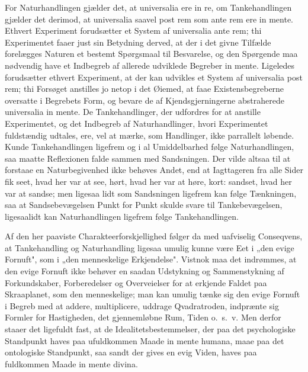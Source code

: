 \documentclass[12pt]{book}
\newcommand{\opage}[1]{\marginnote{\footnotesize\textit{[#1]}}}
\begin{document}
For Naturhandlingen gjælder det, at universalia ere in re, om Tankehandlingen gjælder det derimod,
at universalia saavel post rem som ante rem ere in mente. Ethvert Experiment forudsætter et System
af universalia ante rem; thi Experimentet faaer just sin Betydning derved, at der i
\opage{212} det givne Tilfælde forelægges Naturen et bestemt Spørgsmaal til Besvarelse, og den Spørgende maa
nødvendig have et Indbegreb af allerede udviklede Begreber in mente. Ligeledes forudsætter ethvert
Experiment, at der kan udvikles et System af universalia post rem; thi Forsøget anstilles jo netop
i det Øiemed, at faae Existensbegreberne oversatte i Begrebets Form, og bevare de af
Kjendsgjerningerne abstraherede universalia in mente. De Tankehandlinger, der udfordres for at
anstille Experimentet, og det Indbegreb af Naturhandlinger, hvori Experimentet fuldstændig udtales,
ere, vel at mærke, som Handlinger, ikke parrallelt løbende. Kunde Tankehandlingen ligefrem og i al
Umiddelbarhed følge Naturhandlingen, saa maatte Reflexionen falde sammen med Sandsningen. Der vilde
altsaa til at forstaae en Naturbegivenhed ikke behøves Andet, end at Iagttageren fra alle Sider fik
seet, hvad her var at see, hørt, hvad her var at høre, kort: sandset, hvad her var at sandse; men
ligesaa lidt som Sandsningen ligefrem kan følge Tænkningen, saa at Sandsebevægelsen Punkt for Punkt
skulde svare til Tankebevægelsen, ligesaalidt kan Naturhandlingen ligefrem følge Tankehandlingen.

Af den her paaviste Charakteerforskjellighed følger da med uafviselig Conseqvens, at Tankehandling
og Naturhandling ligesaa umulig kunne være Eet i „den evige Fornuft", som i „den menneskelige
Erkjendelse". Vistnok maa det indrømmes, at den evige Fornuft ikke behøver en saadan Udstykning og
Sammenstykning af Forkundskaber, Forberedelser og Overveielser for at erkjende Faldet paa
Skraaplanet, som den menneskelige; man kan umulig tænke sig den evige Fornuft i Begreb med at
addere, multiplicere, uddrage Qvadratroden, indprænte sig Formler for Hastigheden, det gjennemløbne
Rum, Tiden o.\ s.\ v. Men derfor staaer det ligefuldt fast, at de Idealitetsbestemmelser, der paa
det psychologiske Standpunkt haves paa ufuldkommen Maade in mente humana, maae
\opage{213} paa det ontologiske Standpunkt, saa sandt der gives en evig Viden, haves paa fuldkommen Maade in
mente divina.
\end{document}
